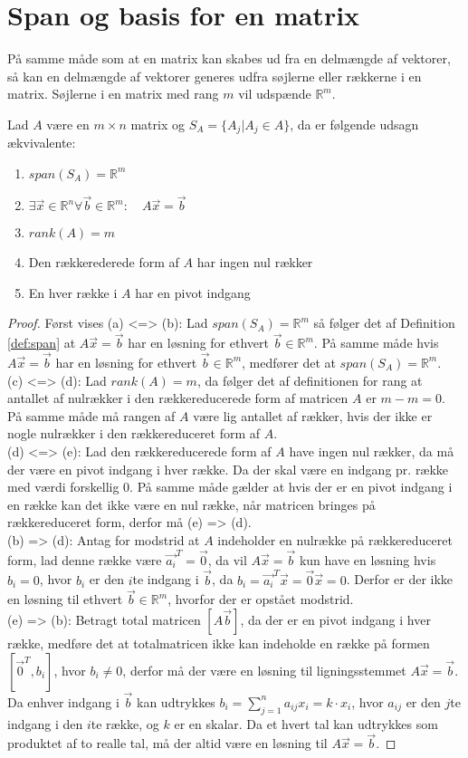 \section{Span og basis for en matrix}
På samme måde som at en matrix kan skabes ud fra en delmængde af vektorer, så kan en delmængde af vektorer generes udfra søjlerne eller rækkerne i en matrix. 
Søjlerne i en matrix med rang $m$ vil udspænde $\mathds{R}^m$.
\begin{stn}
Lad $A$ være en $m\times n$ matrix og $S_A= \{A_j| A_j \in A\}$, da er følgende udsagn ækvivalente:
\begin{enumerate}[label=\alph*]
\item $span(S_A) = \mathds{R}^m$
\item $\exists \vec{x} \in \mathds{R}^n \forall \vec{b} \in \mathds{R}^m: \quad A\vec{x}=\vec{b}$
\item $rank(A) = m$
\item Den rækkerederede form af $A$ har ingen nul rækker
\item En hver række i $A$ har en pivot indgang
\end{enumerate}
\end{stn}
\begin{proof}
Først vises (a) <=> (b):
Lad $span(S_A) = \mathds{R}^m$ så følger det af Definition \ref{def:span} at $A\vec{x}= \vec{b}$ har en løsning for ethvert $\vec{b} \in \mathds{R}^m$.
På samme måde hvis $A\vec{x}= \vec{b}$ har en løsning for ethvert $\vec{b} \in \mathds{R}^m$, medfører det at $span(S_A) = \mathds{R}^m$. 
\\(c) <=> (d): 
Lad $rank(A) = m$, da følger det af definitionen for rang at antallet af nulrækker i den rækkereducerede form af matricen $A$ er $m-m = 0$.
På samme måde må rangen af $A$ være lig antallet af rækker, hvis der ikke er nogle nulrækker i den rækkereduceret form af $A$.
\\(d) <=> (e):
Lad den rækkereducerede form af $A$ have ingen nul rækker, da må der være en pivot indgang i hver række. 
Da der skal være en indgang pr. række med værdi forskellig $0$. 
På samme måde gælder at hvis der er en pivot indgang i en række kan det ikke være en nul række, når matricen bringes på rækkereduceret form, derfor må (e) => (d).
\\(b) => (d):
Antag for modstrid at $A$ indeholder en nulrække på rækkereduceret form, lad denne række være $\vec{a_i}^T = \vec{0}$, da vil $A\vec{x} = \vec{b}$ kun have en løsning hvis $b_i=0$, hvor $b_i$ er den $i$te indgang i $\vec{b}$, da $b_i = \vec{a_i}^T \vec{x} = \vec{0} \vec{x} = 0$. 
Derfor er der ikke en løsning til ethvert $\vec{b} \in \mathds{R}^m$, hvorfor der er opstået modstrid.
\\(e) => (b): 
Betragt total matricen $[A \vec{b}]$, da der er en pivot indgang i hver række, medføre det at totalmatricen ikke kan indeholde en række på formen $[\vec{0}^T, b_i]$, hvor $b_i \neq 0$, derfor må der være en løsning til ligningsstemmet $A\vec{x} = \vec{b}$.
Da enhver indgang i $\vec{b}$ kan udtrykkes $b_i = \sum_{j=1}^n a_{ij} x_i = k \cdot x_i$, hvor $a_{ij}$ er den $j$te indgang i den $i$te række, og $k$ er en skalar.
Da et hvert tal kan udtrykkes som produktet af to realle tal, må der altid være en løsning til $A\vec{x}=\vec{b}$.
\end{proof}
